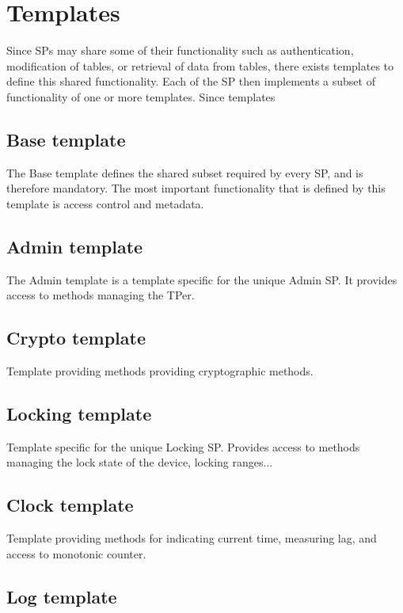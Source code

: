 \section{Templates}

Since SPs may share some of their functionality such as authentication, modification of tables, or retrieval of data from tables, there exists templates to define this shared functionality. Each of the SP then implements a subset of functionality of one or more templates. Since templates 

\subsection{Base template}

The Base template defines the shared subset required by every SP, and is therefore mandatory. The most important functionality that is defined by this template is access control and metadata.

\subsection{Admin template}

The Admin template is a template specific for the unique Admin SP. It provides access to methods managing the TPer.

\subsection{Crypto template}

Template providing methods providing cryptographic methods.

\subsection{Locking template}

Template specific for the unique Locking SP. Provides access to methods managing the lock state of the device, locking ranges...

\subsection{Clock template}

Template providing methods for indicating current time, measuring lag, and access to monotonic counter. 

\subsection{Log template}

